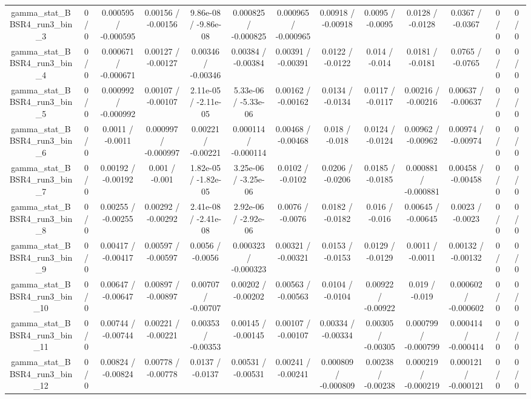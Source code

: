 \documentclass[10pt]{article}
\begin{document}
\begin{table}[htbp]
\begin{center}
\begin{tabular}{|c|c|c|c|c|c|c|c|c|c|c|c|c|}
  gamma_stat_BBSR4_run3_bin_3 & 0 / 0 & 0.000595 / -0.000595 & 0.00156 / -0.00156 & 9.86e-08 / -9.86e-08 & 0.000825 / -0.000825 & 0.000965 / -0.000965 & 0.00918 / -0.00918 & 0.0095 / -0.0095 & 0.0128 / -0.0128 & 0.0367 / -0.0367 & 0 / 0 & 0 / 0 \\ 
  gamma_stat_BBSR4_run3_bin_4 & 0 / 0 & 0.000671 / -0.000671 & 0.00127 / -0.00127 & 0.00346 / -0.00346 & 0.00384 / -0.00384 & 0.00391 / -0.00391 & 0.0122 / -0.0122 & 0.014 / -0.014 & 0.0181 / -0.0181 & 0.0765 / -0.0765 & 0 / 0 & 0 / 0 \\ 
  gamma_stat_BBSR4_run3_bin_5 & 0 / 0 & 0.000992 / -0.000992 & 0.00107 / -0.00107 & 2.11e-05 / -2.11e-05 & 5.33e-06 / -5.33e-06 & 0.00162 / -0.00162 & 0.0134 / -0.0134 & 0.0117 / -0.0117 & 0.00216 / -0.00216 & 0.00637 / -0.00637 & 0 / 0 & 0 / 0 \\ 
  gamma_stat_BBSR4_run3_bin_6 & 0 / 0 & 0.0011 / -0.0011 & 0.000997 / -0.000997 & 0.00221 / -0.00221 & 0.000114 / -0.000114 & 0.00468 / -0.00468 & 0.018 / -0.018 & 0.0124 / -0.0124 & 0.00962 / -0.00962 & 0.00974 / -0.00974 & 0 / 0 & 0 / 0 \\ 
  gamma_stat_BBSR4_run3_bin_7 & 0 / 0 & 0.00192 / -0.00192 & 0.001 / -0.001 & 1.82e-05 / -1.82e-05 & 3.25e-06 / -3.25e-06 & 0.0102 / -0.0102 & 0.0206 / -0.0206 & 0.0185 / -0.0185 & 0.000881 / -0.000881 & 0.00458 / -0.00458 & 0 / 0 & 0 / 0 \\ 
  gamma_stat_BBSR4_run3_bin_8 & 0 / 0 & 0.00255 / -0.00255 & 0.00292 / -0.00292 & 2.41e-08 / -2.41e-08 & 2.92e-06 / -2.92e-06 & 0.0076 / -0.0076 & 0.0182 / -0.0182 & 0.016 / -0.016 & 0.00645 / -0.00645 & 0.0023 / -0.0023 & 0 / 0 & 0 / 0 \\ 
  gamma_stat_BBSR4_run3_bin_9 & 0 / 0 & 0.00417 / -0.00417 & 0.00597 / -0.00597 & 0.0056 / -0.0056 & 0.000323 / -0.000323 & 0.00321 / -0.00321 & 0.0153 / -0.0153 & 0.0129 / -0.0129 & 0.0011 / -0.0011 & 0.00132 / -0.00132 & 0 / 0 & 0 / 0 \\ 
  gamma_stat_BBSR4_run3_bin_10 & 0 / 0 & 0.00647 / -0.00647 & 0.00897 / -0.00897 & 0.00707 / -0.00707 & 0.00202 / -0.00202 & 0.00563 / -0.00563 & 0.0104 / -0.0104 & 0.00922 / -0.00922 & 0.019 / -0.019 & 0.000602 / -0.000602 & 0 / 0 & 0 / 0 \\ 
  gamma_stat_BBSR4_run3_bin_11 & 0 / 0 & 0.00744 / -0.00744 & 0.00221 / -0.00221 & 0.00353 / -0.00353 & 0.00145 / -0.00145 & 0.00107 / -0.00107 & 0.00334 / -0.00334 & 0.00305 / -0.00305 & 0.000799 / -0.000799 & 0.000414 / -0.000414 & 0 / 0 & 0 / 0 \\ 
  gamma_stat_BBSR4_run3_bin_12 & 0 / 0 & 0.00824 / -0.00824 & 0.00778 / -0.00778 & 0.0137 / -0.0137 & 0.00531 / -0.00531 & 0.00241 / -0.00241 & 0.000809 / -0.000809 & 0.00238 / -0.00238 & 0.000219 / -0.000219 & 0.000121 / -0.000121 & 0 / 0 & 0 / 0 \\ 

\end{tabular}
\end{center}
\end{table}
\end{document}
